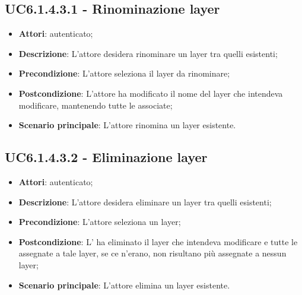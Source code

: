 \subsection{UC6.1.4.3.1 - Rinominazione layer}
\label{ssec:UC6.1.4.3.1}
\begin{itemize}
\item \textbf{Attori}:  autenticato;
\item \textbf{Descrizione}: L'attore desidera rinominare un layer tra quelli esistenti;
\item \textbf{Precondizione}: L'attore seleziona il layer da rinominare;
\item \textbf{Postcondizione}: L'attore ha modificato il nome del layer che intendeva modificare, mantenendo tutte le  associate;
\item \textbf{Scenario principale}: L'attore rinomina un layer esistente.
\end{itemize}
\subsection{UC6.1.4.3.2 - Eliminazione layer}
\label{ssec:UC6.1.4.3.2}
\begin{itemize}
\item \textbf{Attori}:  autenticato;
\item \textbf{Descrizione}: L'attore desidera eliminare un layer tra quelli esistenti;
\item \textbf{Precondizione}: L'attore seleziona un layer;
\item \textbf{Postcondizione}: L' ha eliminato il layer che intendeva modificare e tutte le  assegnate a tale layer, se ce n'erano, non risultano più assegnate a nessun layer;
\item \textbf{Scenario principale}: L'attore elimina un layer esistente.
\end{itemize}
\newpage
